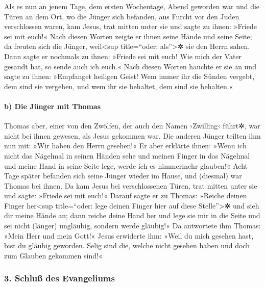  Als es nun an jenem Tage, dem ersten Wochentage, Abend
geworden war und die Türen an dem Ort, wo die Jünger sich befanden, aus
Furcht vor den Juden verschlossen waren, kam Jesus, trat mitten unter
sie und sagte zu ihnen: »Friede sei mit euch!«  Nach
diesen Worten zeigte er ihnen seine Hände und seine Seite; da freuten
sich die Jünger, weil\textless sup title=``oder: als''\textgreater✲ sie
den Herrn sahen.  Dann sagte er nochmals zu ihnen:
»Friede sei mit euch! Wie mich der Vater gesandt hat, so sende auch ich
euch.«  Nach diesen Worten hauchte er sie an und sagte zu
ihnen: »Empfanget heiligen Geist!  Wem immer ihr die
Sünden vergebt, dem sind sie vergeben, und wem ihr sie behaltet, dem
sind sie behalten.«

\hypertarget{b-die-juxfcnger-mit-thomas}{%
\paragraph{b) Die Jünger mit Thomas}\label{b-die-juxfcnger-mit-thomas}}

 Thomas aber, einer von den Zwölfen, der auch den Namen
›Zwilling‹ führt✲, war nicht bei ihnen gewesen, als Jesus gekommen war.
 Die anderen Jünger teilten ihm nun mit: »Wir haben den
Herrn gesehen!« Er aber erklärte ihnen: »Wenn ich nicht das Nägelmal in
seinen Händen sehe und meinen Finger in das Nägelmal und meine Hand in
seine Seite lege, werde ich es nimmermehr glauben!«  Acht
Tage später befanden sich seine Jünger wieder im Hause, und (diesmal)
war Thomas bei ihnen. Da kam Jesus bei verschlossenen Türen, trat mitten
unter sie und sagte: »Friede sei mit euch!«  Darauf sagte
er zu Thomas: »Reiche deinen Finger her\textless sup title=``oder: lege
deinen Finger hier auf diese Stelle''\textgreater✲ und sieh dir meine
Hände an; dann reiche deine Hand her und lege sie mir in die Seite und
sei nicht (länger) ungläubig, sondern werde gläubig!«  Da
antwortete ihm Thomas: »Mein Herr und mein Gott!«  Jesus
erwiderte ihm: »Weil du mich gesehen hast, bist du gläubig geworden.
Selig sind die, welche nicht gesehen haben und doch zum Glauben gekommen
sind!«

\hypertarget{schluuxdf-des-evangeliums}{%
\subsubsection{3. Schluß des
Evangeliums}\label{schluuxdf-des-evangeliums}}


